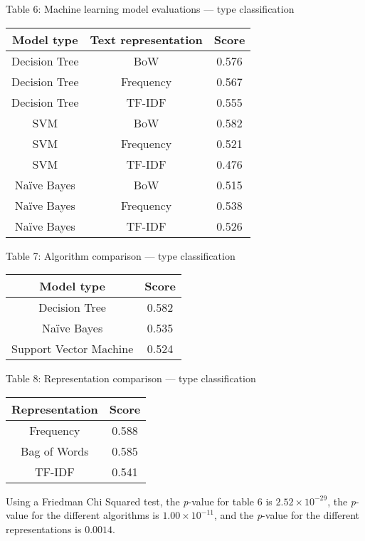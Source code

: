 \documentclass{article}
\begin{document}
\begin{center}
Table 6: Machine learning model evaluations --- type classification\\
\begin{tabular}{ |c|c|c| }
\hline {\bf Model type} & {\bf Text representation} & {\bf Score} \\
\hline Decision Tree & BoW & 0.576\\
\hline Decision Tree & Frequency & 0.567\\
\hline Decision Tree & TF-IDF & 0.555\\
\hline SVM & BoW & 0.582\\
\hline SVM & Frequency & 0.521\\
\hline SVM & TF-IDF & 0.476\\
\hline Naïve Bayes & BoW & 0.515\\
\hline Naïve Bayes & Frequency & 0.538\\
\hline Naïve Bayes & TF-IDF & 0.526\\
\hline
\end{tabular}
\end{center}

\begin{center}
Table 7: Algorithm comparison --- type classification\\
\begin{tabular}{ |c|c| }
\hline {\bf Model type}& {\bf Score}\\
\hline Decision Tree & 0.582\\
\hline Naïve Bayes & 0.535\\
\hline Support Vector Machine & 0.524\\
\hline
\end{tabular}
\end{center}

\begin{center}
Table 8: Representation comparison --- type classification\\
\begin{tabular}{ |c|c| }
\hline {\bf Representation}& {\bf Score}\\
\hline Frequency & 0.588\\
\hline Bag of Words & 0.585\\
\hline TF-IDF & 0.541\\
\hline
\end{tabular}
\end{center}

Using a Friedman Chi Squared test, the \emph{p}-value for table 6 is $2.52 \times 10^{-29}$, the \emph{p}-value for the different algorithms is $1.00 \times 10^{-11}$, and the \emph{p}-value for the different representations is $0.0014$.
\end{document}
